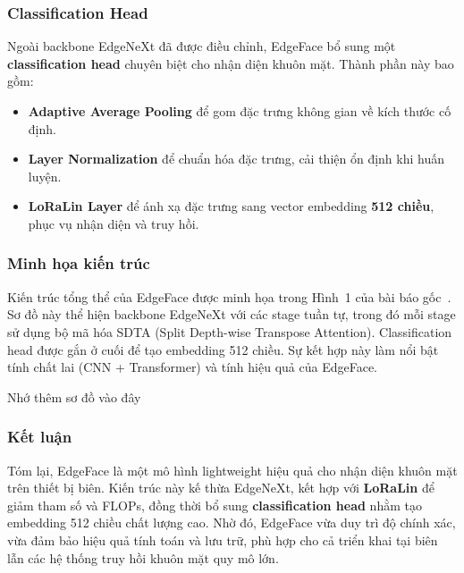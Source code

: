 \subsubsection{Classification Head}
Ngoài backbone EdgeNeXt đã được điều chỉnh, EdgeFace bổ sung một \textbf{classification head} chuyên biệt cho nhận diện khuôn mặt. Thành phần này bao gồm:
\begin{itemize}
    \item \textbf{Adaptive Average Pooling} để gom đặc trưng không gian về kích thước cố định.
    \item \textbf{Layer Normalization} để chuẩn hóa đặc trưng, cải thiện ổn định khi huấn luyện.
    \item \textbf{LoRaLin Layer} để ánh xạ đặc trưng sang vector embedding \textbf{512 chiều}, phục vụ nhận diện và truy hồi.
\end{itemize}

\subsubsection{Minh họa kiến trúc}
Kiến trúc tổng thể của EdgeFace được minh họa trong Hình~1 của bài báo gốc~\cite{george2024edgeface}. Sơ đồ này thể hiện backbone EdgeNeXt với các stage tuần tự, trong đó mỗi stage sử dụng bộ mã hóa SDTA (Split Depth-wise Transpose Attention). Classification head được gắn ở cuối để tạo embedding 512 chiều. Sự kết hợp này làm nổi bật tính chất lai (CNN + Transformer) và tính hiệu quả của EdgeFace.

Nhớ thêm sơ đồ vào đây
\subsubsection{Kết luận}
Tóm lại, EdgeFace là một mô hình lightweight hiệu quả cho nhận diện khuôn mặt trên thiết bị biên. Kiến trúc này kế thừa EdgeNeXt, kết hợp với \textbf{LoRaLin} để giảm tham số và FLOPs, đồng thời bổ sung \textbf{classification head} nhằm tạo embedding 512 chiều chất lượng cao. Nhờ đó, EdgeFace vừa duy trì độ chính xác, vừa đảm bảo hiệu quả tính toán và lưu trữ, phù hợp cho cả triển khai tại biên lẫn các hệ thống truy hồi khuôn mặt quy mô lớn.




